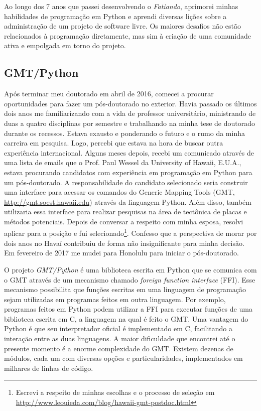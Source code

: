 \documentclass[12pt,a4paper,oneside,titlepage,onecolumn]{article}
\begin{document}
Ao longo dos 7 anos que passei desenvolvendo o \textit{Fatiando},
aprimorei minhas habilidades de programação em Python e aprendi diversas lições
sobre a administração de um projeto de software livre.
Os maiores desafios não estão relacionados à programação diretamente, mas sim à
criação de uma comunidade ativa e empolgada em torno do projeto.


\subsection{GMT/Python}

Após terminar meu doutorado em abril de 2016, comecei a procurar oportunidades
para fazer um pós-doutorado no exterior.
Havia passado os últimos dois anos me familiarizando com a vida de professor
universitário, ministrando de duas a quatro disciplinas por semestre e
trabalhando na minha tese de doutorado durante os recessos.
Estava exausto e ponderando o futuro e o rumo da minha carreira em pesquisa.
Logo, percebi que estava na hora de buscar outra experiência internacional.
Alguns meses depois, recebi um comunicado através de uma lista de emails que o
Prof. Paul Wessel da University of Hawaii, E.U.A., estava procurando candidatos
com experiência em programação em Python para um pós-doutorado.
A responsabilidade do candidato selecionado seria construir uma interface
para acessar os comandos do Generic Mapping Tools (GMT,
\url{http://gmt.soest.hawaii.edu}) através da linguagem Python.
Além disso, também utilizaria essa interface para realizar pesquisas na área de
tectônica de placas e métodos potenciais.
Depois de conversar a respeito com minha esposa, resolvi aplicar para a
posição e fui selecionado\footnote{Escrevi a respeito de minhas escolhas e o
processo de seleção em
\url{http://www.leouieda.com/blog/hawaii-gmt-postdoc.html}}.
Confesso que a perspectiva de morar por dois anos no Havaí contribuiu
de forma não insignificante para minha decisão.
Em fevereiro de 2017 me mudei para Honolulu para iniciar o pós-doutorado.

O projeto \textit{GMT/Python} é uma biblioteca escrita em Python que se
comunica com o GMT através de um mecanismo chamado \textit{foreign function
interface} (FFI).
Esse mecanismo possibilita que funções escritas em uma linguagem de programação
sejam utilizadas em programas feitos em outra linguagem.
Por exemplo, programas feitos em Python podem utilizar a FFI para executar
funções de uma biblioteca escrita em C, a linguagem na qual é feito o GMT.
Uma vantagem do Python é que seu interpretador oficial é implementado em C,
facilitando a interação entre as duas linguagens.
A maior dificuldade que encontrei até o presente momento é a enorme
complexidade do GMT.
Existem dezenas de módulos, cada um com diversas opções e particularidades,
implementados em milhares de linhas de código.
\end{document}
